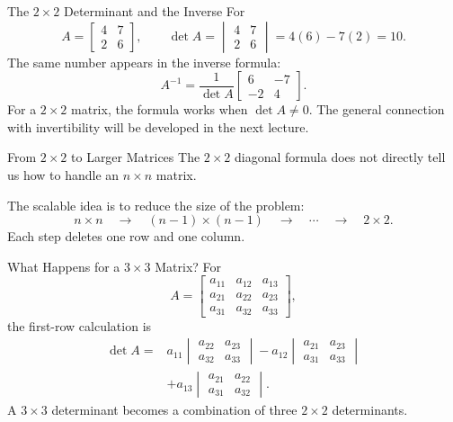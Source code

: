 \begin{frame}{The $2\times2$ Determinant and the Inverse}
For
\[
A=\begin{bmatrix}4&7\\2&6\end{bmatrix},
\qquad
\det A
=\begin{vmatrix}4&7\\2&6\end{vmatrix}
=4(6)-7(2)=10.
\]
\pause
The same number appears in the inverse formula:
\[
A^{-1}
=\frac{1}{\det A}
\begin{bmatrix}6&-7\\-2&4\end{bmatrix}.
\]
For a $2\times2$ matrix, the formula works when $\det A\ne0$.
The general connection with invertibility will be developed in the next lecture.
\end{frame}

\begin{frame}{From $2\times2$ to Larger Matrices}
The $2\times2$ diagonal formula does not directly tell us how to handle an $n\times n$ matrix.
\pause

The scalable idea is to reduce the size of the problem:
\[
n\times n
\quad\longrightarrow\quad
(n-1)\times(n-1)
\quad\longrightarrow\quad\cdots\quad\longrightarrow\quad
2\times2.
\]
\pause
Each step deletes one row and one column.
\end{frame}

\begin{frame}{What Happens for a $3\times3$ Matrix?}
For
\[
A=\begin{bmatrix}
a_{11}&a_{12}&a_{13}\\
a_{21}&a_{22}&a_{23}\\
a_{31}&a_{32}&a_{33}
\end{bmatrix},
\]
the first-row calculation is
\[
\begin{aligned}
\det A
={}&a_{11}\begin{vmatrix}a_{22}&a_{23}\\a_{32}&a_{33}\end{vmatrix}
-a_{12}\begin{vmatrix}a_{21}&a_{23}\\a_{31}&a_{33}\end{vmatrix}\\
&+a_{13}\begin{vmatrix}a_{21}&a_{22}\\a_{31}&a_{32}\end{vmatrix}.
\end{aligned}
\]
\pause
A $3\times3$ determinant becomes a combination of three $2\times2$ determinants.
\end{frame}

